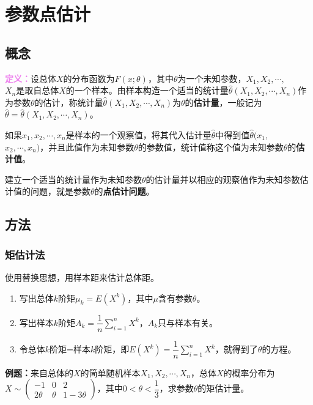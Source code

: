 \documentclass[UTF8, 12pt]{ctexart}
\begin{document}
\section{参数点估计}

\subsection{概念}

\textcolor{violet}{\textbf{定义：}}设总体$X$的分布函数为$F(x;\theta)$，其中$\theta$为一个未知参数，$X_1,X_2,\cdots,$\\$X_n$是取自总体$X$的一个样本。由样本构造一个适当的统计量$\hat{\theta}(X_1,X_2,\cdots,X_n)$作为参数$\theta$的估计，称统计量$\hat{\theta}(X_1,X_2,\cdots,X_n)$为$\theta$的\textbf{估计量}，一般记为$\hat{\theta}=\hat{\theta}(X_1,X_2,\cdots,X_n)$。

如果$x_1,x_2,\cdots,x_n$是样本的一个观察值，将其代入估计量$\hat{\theta}$中得到值$\hat{\theta}(x_1,$\\$x_2,\cdots,x_n)$，并且此值作为未知参数$\theta$的参数值，统计值称这个值为未知参数$\theta$的\textbf{估计值}。

建立一个适当的统计量作为未知参数$\theta$的估计量并以相应的观察值作为未知参数估计值的问题，就是参数$\theta$的\textbf{点估计问题}。

\subsection{方法}

\subsubsection{矩估计法}

使用替换思想，用样本距来估计总体距。

\begin{enumerate}
    \item 写出总体$k$阶矩$\mu_k=E(X^k)$，其中$\mu$含有参数$\theta$。
    \item 写出样本$k$阶矩$A_k=\dfrac{1}{n}\sum\limits_{i=1}^nX^k$，$A_k$只与样本有关。
    \item 令总体$k$阶矩=样本$k$阶矩，即$E(X^k)=\dfrac{1}{n}\sum\limits_{i=1}^nX^k$，就得到了$\theta$的方程。
\end{enumerate}

\textbf{例题：}来自总体的$X$的简单随机样本$X_1,X_2,\cdots,X_n$，总体$X$的概率分布为$X\sim\left(\begin{array}{ccc}
    -1 & 0 & 2 \\
    2\theta & \theta & 1-3\theta
\end{array}\right)$，其中$0<\theta<\dfrac{1}{3}$，求参数$\theta$的矩估计量。
\end{document}
